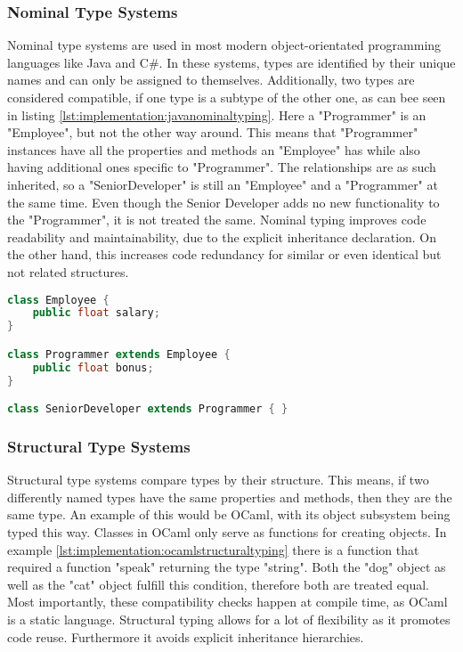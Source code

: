 \subsubsection{Nominal Type Systems}

Nominal type systems are used in most modern object-orientated programming languages like Java and C\#. In these systems, types are identified by their unique names and can only be assigned to themselves. Additionally, two types are considered compatible, if one type is a subtype of the other one, as can bee seen in listing \ref{lst:implementation:javanominaltyping}. Here a "Programmer" is an "Employee", but not the other way around. This means that "Programmer" instances have all the properties and methods an "Employee" has while also having additional ones specific to "Programmer". The relationships are as such inherited, so a "SeniorDeveloper" is still an "Employee" and a "Programmer" at the same time. Even though the Senior Developer adds no new functionality to the "Programmer", it is not treated the same. Nominal typing improves code readability and maintainability, due to the explicit inheritance declaration. On the other hand, this increases code redundancy for similar or even identical but not related structures.

\begin{lstlisting}[language=Java,caption=Example of nominal typing in java,label=lst:implementation:javanominaltyping]
class Employee {
	public float salary;
}

class Programmer extends Employee {
	public float bonus;
}

class SeniorDeveloper extends Programmer { }
\end{lstlisting}

\subsubsection{Structural Type Systems}

Structural type systems compare types by their structure. This means, if two differently named types have the same properties and methods, then they are the same type. An example of this would be OCaml, with its object subsystem being typed this way. Classes in OCaml only serve as functions for creating objects. In example \ref{lst:implementation:ocamlstructuraltyping} there is a function that required a function "speak" returning the type "string". Both the "dog" object as well as the "cat" object fulfill this condition, therefore both are treated equal. Most importantly, these compatibility checks happen at compile time, as OCaml is a static language. Structural typing allows for a lot of flexibility as it promotes code reuse. Furthermore it avoids explicit inheritance hierarchies.

